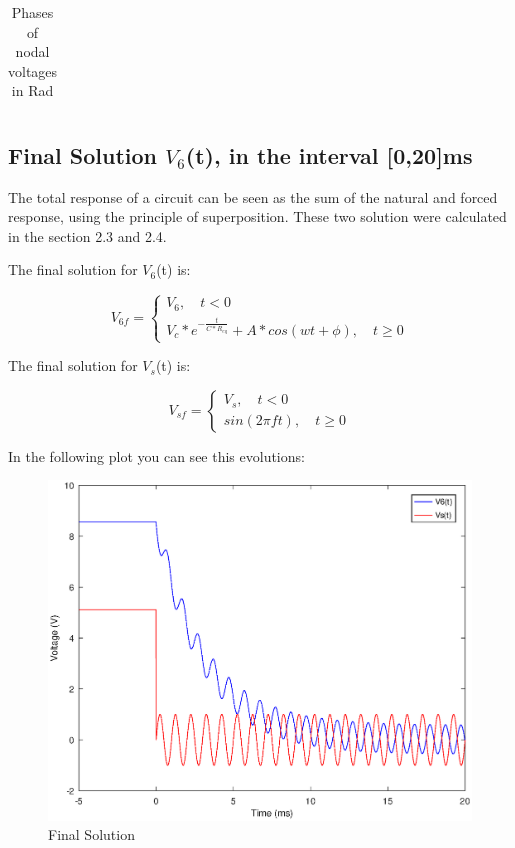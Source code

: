 \begin{table}[h]
\centering
\begin{tabularx}{0.6\textwidth} {
  | >{\raggedright\arraybackslash}X
  | >{\raggedleft\arraybackslash}X | }
 \hline

\end{tabularx}
\caption{Phases of nodal voltages in Rad}
\end{table}

\subsection{Final Solution $V_{6}$(t), in the interval [0,20]ms}


\par The total response of a circuit can be seen as the sum of the natural and forced response, using the principle of superposition. These two solution were calculated in the section 2.3 and 2.4.

The final solution for $V_6$(t) is: 

\begin{equation}
    V_{6f} = \begin{cases} V_6, \quad t<0 \\ V_{c}*e^{-\frac{t}{C*R_{eq}}} + A*cos(wt + \phi), \quad t \geq 0  \end{cases}
\end{equation}


The final solution for $V_s$(t) is:

\begin{equation}
    V_{sf} = \begin{cases} V_s, \quad t<0 \\ sin(2 \pi ft), \quad t \geq 0 \end{cases}
\end{equation}

In the following plot you can see this evolutions:

\begin{figure}[h] \centering
\includegraphics[width=0.7\linewidth]{forced_and_natural_solution.eps}
\caption{Final Solution}
\label{fig:snat}
\end{figure}

